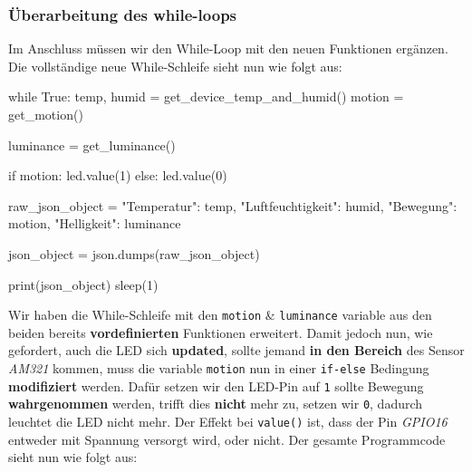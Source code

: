 \documentclass[18pt]{article}
\begin{document}
\subsubsection{Überarbeitung des while-loops}
Im Anschluss müssen wir den While-Loop mit den neuen Funktionen ergänzen.
Die vollständige neue While-Schleife sieht nun wie folgt aus:
\begin{python}
while True:	
	temp, humid = get_device_temp_and_humid()
	motion = get_motion()
	
	luminance = get_luminance()
	
	if motion:
		led.value(1)
	else:
		led.value(0)
	
	raw_json_object = {
		"Temperatur": temp,
		"Luftfeuchtigkeit": humid,
		"Bewegung": motion,
		"Helligkeit": luminance
	}
	
	json_object = json.dumps(raw_json_object)
	
	print(json_object)
	sleep(1)
\end{python}
Wir haben die While-Schleife mit den \texttt{motion} \& \texttt{luminance} variable aus den beiden bereits \textbf{vordefinierten} Funktionen erweitert.
Damit jedoch nun, wie gefordert, auch die LED sich \textbf{updated}, sollte jemand \textbf{in den Bereich} des Sensor \textit{AM321} kommen, muss die variable \texttt{motion} nun in einer \texttt{if-else} Bedingung \textbf{modifiziert} werden.
Dafür setzen wir den LED-Pin auf \texttt{1} sollte Bewegung \textbf{wahrgenommen} werden, trifft dies \textbf{nicht} mehr zu, setzen wir \texttt{0}, dadurch leuchtet die LED nicht mehr. Der Effekt bei \texttt{value()} ist, dass der Pin \textit{GPIO16} entweder mit Spannung versorgt wird, oder nicht.
\newline
\newline
Der gesamte Programmcode sieht nun wie folgt aus:
\end{document}
